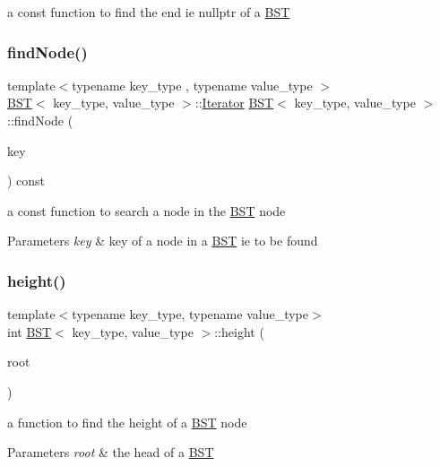 a const function to find the end ie nullptr of a \mbox{\hyperlink{class_b_s_t}{B\+ST}} \mbox{\label{class_b_s_t_afba6a6e105b99505add378003d233ad4}} 
\subsubsection{\texorpdfstring{findNode()}{findNode()}}
{\footnotesize\ttfamily template$<$typename key\+\_\+type , typename value\+\_\+type $>$ \\
\mbox{\hyperlink{class_b_s_t}{B\+ST}}$<$ key\+\_\+type, value\+\_\+type $>$\+::\mbox{\hyperlink{class_b_s_t_1_1_iterator}{Iterator}} \mbox{\hyperlink{class_b_s_t}{B\+ST}}$<$ key\+\_\+type, value\+\_\+type $>$\+::find\+Node (\begin{DoxyParamCaption}\item[{const key\+\_\+type \&}]{key }\end{DoxyParamCaption}) const}

a const function to search a node in the \mbox{\hyperlink{class_b_s_t}{B\+ST}} node 
\begin{DoxyParams}{Parameters}
{\em key} & key of a node in a \mbox{\hyperlink{class_b_s_t}{B\+ST}} ie to be found \\
\hline
\end{DoxyParams}
\mbox{\label{class_b_s_t_ac4a87a73b520f99529c4a891d5c2d083}} 
\subsubsection{\texorpdfstring{height()}{height()}}
{\footnotesize\ttfamily template$<$typename key\+\_\+type, typename value\+\_\+type$>$ \\
int \mbox{\hyperlink{class_b_s_t}{B\+ST}}$<$ key\+\_\+type, value\+\_\+type $>$\+::height (\begin{DoxyParamCaption}\item[{const unique\+\_\+ptr$<$ Node $>$ \&}]{root }\end{DoxyParamCaption})}

a function to find the height of a \mbox{\hyperlink{class_b_s_t}{B\+ST}} node 
\begin{DoxyParams}{Parameters}
{\em root} & the head of a \mbox{\hyperlink{class_b_s_t}{B\+ST}} \\
\hline
\end{DoxyParams}
\mbox{\label{class_b_s_t_a9d5f71106c279bd2f8effd06fa386667}} 
